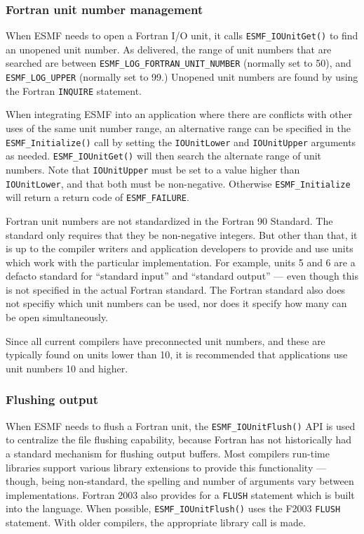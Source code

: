 

\subsubsection{Fortran unit number management}

When ESMF needs to open a Fortran I/O unit, it calls {\tt ESMF\_IOUnitGet()} to find
an unopened unit number.  As delivered, the range of unit numbers that are
searched are between {\tt ESMF\_LOG\_FORTRAN\_UNIT\_NUMBER} (normally set to
50), and {\tt ESMF\_LOG\_UPPER} (normally set to 99.)
Unopened unit numbers are found by using the Fortran {\tt INQUIRE} statement.

When integrating ESMF into an application where there are conflicts with
other uses of the same unit number range, an alternative range can be specified
in the {\tt ESMF\_Initialize()} call by setting the {\tt IOUnitLower} and {\tt IOUnitUpper}
arguments as needed.  {\tt ESMF\_IOUnitGet()} will then search the alternate range
of unit numbers.  Note that {\tt IOUnitUpper} must be set to a value higher than
{\tt IOUnitLower}, and that both must be non-negative.  Otherwise {\tt ESMF\_Initialize}
will return a return code of {\tt ESMF\_FAILURE}.

Fortran unit numbers are not standardized in the Fortran 90 Standard.  The standard
only requires that they be non-negative integers.  But other than that, it is
up to the compiler writers and application developers to provide and
use units which work with the particular implementation.  For example,
units 5 and 6 are a defacto standard for ``standard input'' and
``standard output'' --- even though this is not specified in the actual Fortran
standard.  The Fortran standard also does not specifiy which unit numbers can
be used, nor does it specify how many can be open simultaneously.

Since all current compilers have preconnected unit numbers, and these are
typically found on units lower than 10, it is recommended that applications
use unit numbers 10 and higher.

\subsubsection{Flushing output}

When ESMF needs to flush a Fortran unit, the {\tt ESMF\_IOUnitFlush()} API is used
to centralize the file flushing capability, because Fortran has not historically
had a standard mechanism for flushing output buffers.  Most compilers run-time libraries
support various library extensions to provide this functionality --- though,
being non-standard, the spelling and number of arguments vary between implementations.
Fortran 2003 also provides for a {\tt FLUSH} statement which is built into the
language.  When possible, {\tt ESMF\_IOUnitFlush()} uses the F2003 {\tt FLUSH} statement.
With older compilers, the appropriate library call is made.
